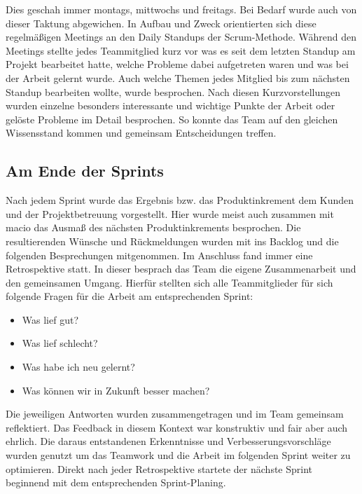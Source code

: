 \documentclass[10pt, a4paper]{article}
\begin{document}
\begin{onehalfspace}
  Dies geschah immer montags, mittwochs und freitags.
  Bei Bedarf wurde auch von dieser Taktung abgewichen.
  In Aufbau und Zweck orientierten sich diese regelmäßigen Meetings an den \glqq Daily Standups\grqq{} der Scrum-Methode.
  Während den Meetings stellte jedes Teammitglied kurz vor was es seit dem letzten Standup am Projekt bearbeitet hatte, welche Probleme dabei aufgetreten waren und was bei der Arbeit gelernt wurde.
  Auch welche Themen jedes Mitglied bis zum nächsten Standup bearbeiten wollte, wurde besprochen.
  Nach diesen Kurzvorstellungen wurden einzelne besonders interessante und wichtige Punkte der Arbeit oder gelöste Probleme im Detail besprochen.
  So konnte das Team auf den gleichen Wissensstand kommen und gemeinsam Entscheidungen treffen.

  \subsection{Am Ende der Sprints}
  Nach jedem Sprint wurde das Ergebnis bzw. das Produktinkrement dem Kunden und der Projektbetreuung vorgestellt.
  Hier wurde meist auch zusammen mit macio das Ausmaß des nächsten Produktinkrements besprochen.
  Die resultierenden Wünsche und Rückmeldungen wurden mit ins Backlog und die folgenden Besprechungen mitgenommen.
  Im Anschluss fand immer eine Retrospektive statt.
  In dieser besprach das Team die eigene Zusammenarbeit und den gemeinsamen Umgang.
  Hierfür stellten sich alle Teammitglieder für sich folgende Fragen für die Arbeit am entsprechenden Sprint:
  \begin{itemize}[noitemsep,topsep=0pt,parsep=0pt,partopsep=0pt]
    \item Was lief gut?
    \item Was lief schlecht?
    \item Was habe ich neu gelernt?
    \item Was können wir in Zukunft besser machen?
  \end{itemize}
  Die jeweiligen Antworten wurden zusammengetragen und im Team gemeinsam reflektiert.
  Das Feedback in diesem Kontext war konstruktiv und fair aber auch ehrlich.
  Die daraus entstandenen Erkenntnisse und Verbesserungsvorschläge wurden genutzt um das Teamwork und die Arbeit im folgenden Sprint weiter zu optimieren.
  Direkt nach jeder Retrospektive startete der nächste Sprint beginnend mit dem entsprechenden Sprint-Planing.


\end{onehalfspace}
\end{document}
